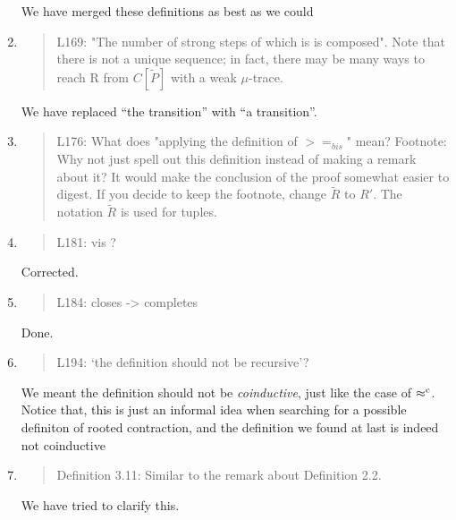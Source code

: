 \begin{enumerate}
  We have merged these definitions as best as we could

\item \begin{quote}
    L169: "The number of strong steps of which is is composed". Note
    that there is not a unique sequence; in fact, there may be many
    ways to reach R from $C[\tilde{P}]$ with a weak $\mu$-trace.
  \end{quote}

  We have replaced ``the transition'' with ``a transition''.

\item \begin{quote}
    L176: What does "applying the definition of $>=_{bis}$" mean?
    Footnote: Why not just spell out this definition instead of making a remark about it?  It would make the conclusion of the proof somewhat easier to digest. If you decide to keep the footnote, change $\tilde{R}$ to $R'$. The notation $\tilde{R}$ is used for tuples.
  \end{quote}

\item \begin{quote}
    L181: vis ?
  \end{quote}

Corrected.
  
\item \begin{quote}
    L184: closes -> completes
  \end{quote}
  Done.
  
\item \begin{quote}
    L194: ‘the definition should not be recursive’?
  \end{quote}

  We meant the definition should not be \emph{coinductive}, just like the
  case of $\mathrel{\approx^{\rm{c}}}$. Notice that, this is just an informal idea when searching for
  a possible definiton of rooted contraction, and the definition we
  found at last is indeed not coinductive 
  
\item \begin{quote}
    Definition 3.11: Similar to the remark about Definition 2.2.
  \end{quote}

We have tried to clarify this.
  

\end{enumerate}
